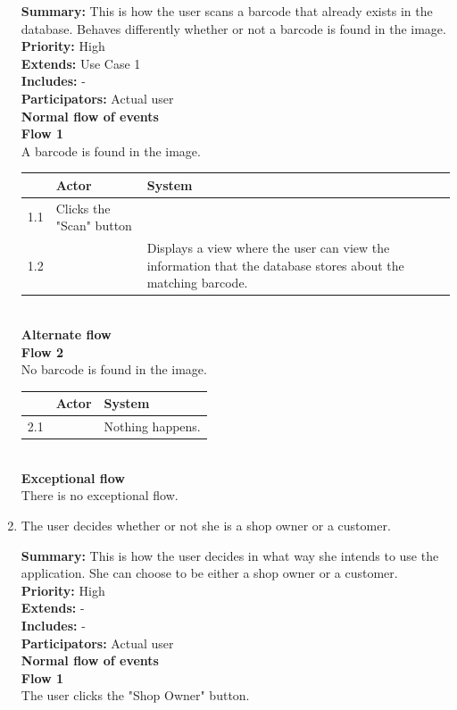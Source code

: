 \documentclass{report}
\begin{document}
\begin{enumerate}
    \textbf{Summary:} This is how the user scans a barcode that already exists in the database. Behaves differently whether or not a barcode is found in the image. \\
    \textbf{Priority:} High \\
    \textbf{Extends:} Use Case 1 \\
    \textbf{Includes:} - \\
    \textbf{Participators:} Actual user \\
    \textbf{Normal flow of events} \\
    \textbf{Flow 1} \\ A barcode is found in the image. \\

    \begin{tabular}{ | l | p{4cm} | p{4cm} |}
    \hline
      & Actor & System \\ \hline
    1.1 & Clicks the "Scan" button & \\ \hline
    1.2 & & Displays a view where the user can view the information that the database stores about the matching barcode. \\
    \hline
    \end{tabular} \\

    \textbf{Alternate flow} \\
    \textbf{Flow 2} \\ No barcode is found in the image. \\

    \begin{tabular}{ | l | p{4cm} | p{4cm} |}
    \hline
      & Actor & System \\ \hline
    2.1 & & Nothing happens. \\
    \hline
    \end{tabular} \\

    \textbf{Exceptional flow} \\ There is no exceptional flow.

\pagebreak

  \item The user decides whether or not she is a shop owner or a customer. \

    \textbf{Summary:} This is how the user decides in what way she intends to use the application. She can choose to be either a shop owner or a customer. \\
    \textbf{Priority:} High \\
    \textbf{Extends:} - \\
    \textbf{Includes:} - \\
    \textbf{Participators:} Actual user \\
    \textbf{Normal flow of events} \\
    \textbf{Flow 1} \\ The user clicks the "Shop Owner" button. \\


\end{enumerate}
\end{document}

